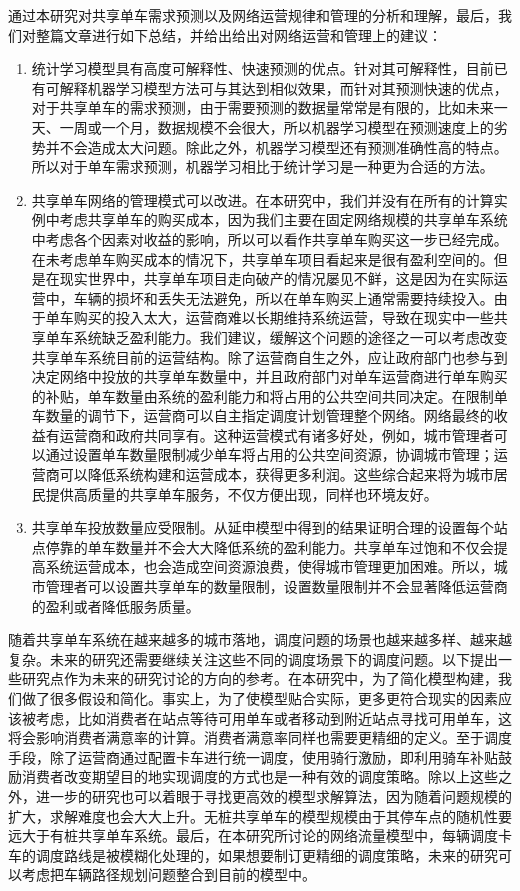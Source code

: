 \documentclass[]{tongjithesis}
\numberwithin{equation}{chapter}
\begin{document}
通过本研究对共享单车需求预测以及网络运营规律和管理的分析和理解，最后，我们对整篇文章进行如下总结，并给出给出对网络运营和管理上的建议：
\begin{enumerate}
	\item 统计学习模型具有高度可解释性、快速预测的优点。针对其可解释性，目前已有可解释机器学习模型方法可与其达到相似效果，而针对其预测快速的优点，对于共享单车的需求预测，由于需要预测的数据量常常是有限的，比如未来一天、一周或一个月，数据规模不会很大，所以机器学习模型在预测速度上的劣势并不会造成太大问题。除此之外，机器学习模型还有预测准确性高的特点。所以对于单车需求预测，机器学习相比于统计学习是一种更为合适的方法。
	\item  共享单车网络的管理模式可以改进。在本研究中，我们并没有在所有的计算实例中考虑共享单车的购买成本，因为我们主要在固定网络规模的共享单车系统中考虑各个因素对收益的影响，所以可以看作共享单车购买这一步已经完成。在未考虑单车购买成本的情况下，共享单车项目看起来是很有盈利空间的。但是在现实世界中，共享单车项目走向破产的情况屡见不鲜，这是因为在实际运营中，车辆的损坏和丢失无法避免，所以在单车购买上通常需要持续投入。由于单车购买的投入太大，运营商难以长期维持系统运营，导致在现实中一些共享单车系统缺乏盈利能力。我们建议，缓解这个问题的途径之一可以考虑改变共享单车系统目前的运营结构。除了运营商自生之外，应让政府部门也参与到决定网络中投放的共享单车数量中，并且政府部门对单车运营商进行单车购买的补贴，单车数量由系统的盈利能力和将占用的公共空间共同决定。在限制单车数量的调节下，运营商可以自主指定调度计划管理整个网络。网络最终的收益有运营商和政府共同享有。这种运营模式有诸多好处，例如，城市管理者可以通过设置单车数量限制减少单车将占用的公共空间资源，协调城市管理；运营商可以降低系统构建和运营成本，获得更多利润。这些综合起来将为城市居民提供高质量的共享单车服务，不仅方便出现，同样也环境友好。
	\item  共享单车投放数量应受限制。从延申模型中得到的结果证明合理的设置每个站点停靠的单车数量并不会大大降低系统的盈利能力。共享单车过饱和不仅会提高系统运营成本，也会造成空间资源浪费，使得城市管理更加困难。所以，城市管理者可以设置共享单车的数量限制，设置数量限制并不会显著降低运营商的盈利或者降低服务质量。
\end{enumerate}
随着共享单车系统在越来越多的城市落地，调度问题的场景也越来越多样、越来越复杂。未来的研究还需要继续关注这些不同的调度场景下的调度问题。以下提出一些研究点作为未来的研究讨论的方向的参考。在本研究中，为了简化模型构建，我们做了很多假设和简化。事实上，为了使模型贴合实际，更多更符合现实的因素应该被考虑，比如消费者在站点等待可用单车或者移动到附近站点寻找可用单车，这将会影响消费者满意率的计算。消费者满意率同样也需要更精细的定义。至于调度手段，除了运营商通过配置卡车进行统一调度，使用骑行激励，即利用骑车补贴鼓励消费者改变期望目的地实现调度的方式也是一种有效的调度策略。除以上这些之外，进一步的研究也可以着眼于寻找更高效的模型求解算法，因为随着问题规模的扩大，求解难度也会大大上升。无桩共享单车的模型规模由于其停车点的随机性要远大于有桩共享单车系统。最后，在本研究所讨论的网络流量模型中，每辆调度卡车的调度路线是被模糊化处理的，如果想要制订更精细的调度策略，未来的研究可以考虑把车辆路径规划问题整合到目前的模型中。
\end{document}
